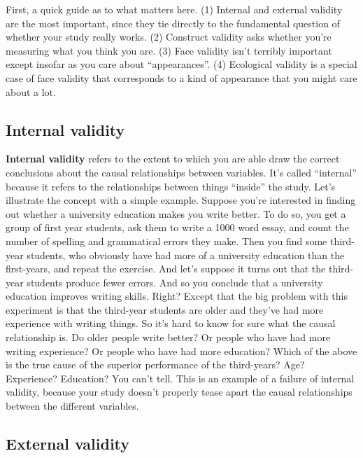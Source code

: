 \documentclass[
]{book}
\begin{document}
First, a quick guide as to what matters here. (1) Internal and external validity are the most important, since they tie directly to the fundamental question of whether your study really works. (2) Construct validity asks whether you're measuring what you think you are. (3) Face validity isn't terribly important except insofar as you care about ``appearances''. (4) Ecological validity is a special case of face validity that corresponds to a kind of appearance that you might care about a lot.

\hypertarget{internal-validity}{%
\subsection{Internal validity}\label{internal-validity}}

\textbf{Internal validity} refers to the extent to which you are able draw the correct conclusions about the causal relationships between variables. It's called ``internal'' because it refers to the relationships between things ``inside'' the study. Let's illustrate the concept with a simple example. Suppose you're interested in finding out whether a university education makes you write better. To do so, you get a group of first year students, ask them to write a 1000 word essay, and count the number of spelling and grammatical errors they make. Then you find some third-year students, who obviously have had more of a university education than the first-years, and repeat the exercise. And let's suppose it turns out that the third-year students produce fewer errors. And so you conclude that a university education improves writing skills. Right? Except that the big problem with this experiment is that the third-year students are older and they've had more experience with writing things. So it's hard to know for sure what the causal relationship is. Do older people write better? Or people who have had more writing experience? Or people who have had more education? Which of the above is the true cause of the superior performance of the third-years? Age? Experience? Education? You can't tell. This is an example of a failure of internal validity, because your study doesn't properly tease apart the causal relationships between the different variables.

\hypertarget{external-validity}{%
\subsection{External validity}\label{external-validity}}
\end{document}
